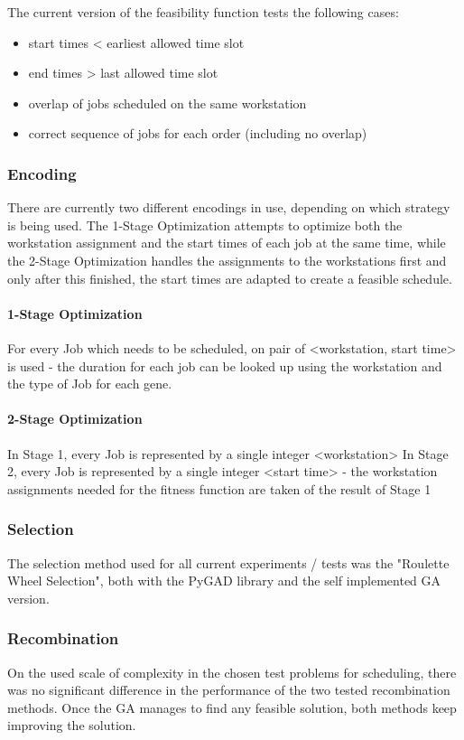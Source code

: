 \documentclass[a4paper,12pt,twoside]{scrreprt}
\begin{document}
\begin{flushleft}
The current version of the feasibility function tests the following cases:
\begin{itemize}
	\item start times < earliest allowed time slot
	\item end times > last allowed time slot
	\item overlap of jobs scheduled on the same workstation
	\item correct sequence of jobs for each order (including no overlap)
\end{itemize}
\subsubsection{Encoding}
There are currently two different encodings in use, depending on which strategy is being used. The 1-Stage Optimization attempts to optimize both the workstation assignment and the start times of each job at the same time, while the 2-Stage Optimization handles the assignments to the workstations first and only after this finished, the start times are adapted to create a feasible schedule.

\paragraph{1-Stage Optimization}
For every Job which needs to be scheduled, on pair of <workstation, start time> is used - the duration for each job can be looked up using the workstation and the type of Job for each gene.

\paragraph{2-Stage Optimization}
In Stage 1, every Job is represented by a single integer <workstation>
In Stage 2, every Job is represented by a single integer <start time> - the workstation assignments needed for the fitness function are taken of the result of Stage 1

\subsubsection{Selection}
The selection method used for all current experiments / tests was the "Roulette Wheel Selection", both with the PyGAD library and the self implemented GA version.

\subsubsection{Recombination}
On the used scale of complexity in the chosen test problems for scheduling, there was no significant difference in the performance of the two tested recombination methods. Once the GA manages to find any feasible solution, both methods keep improving the solution.


\end{flushleft}
\end{document}
